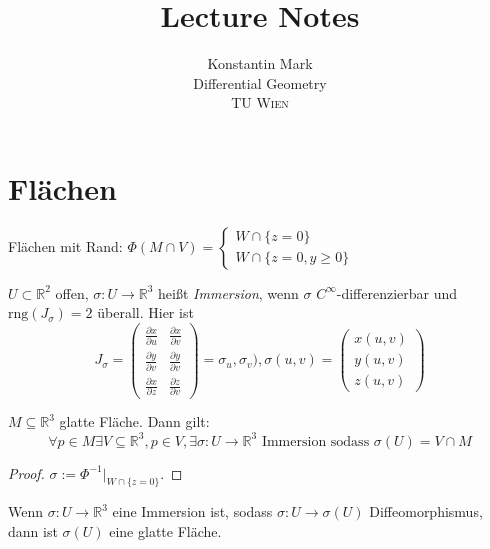 \documentclass[11pt]{article}
\title{Lecture Notes}
\author{Konstantin Mark\\
Differential Geometry\\ 
\textsc{TU Wien}
}
\begin{document}
\maketitle

\section{Flächen}
Flächen mit Rand: $\Phi(M\cap V) = \left\{\begin{array}{c}
     W\cap \{z= 0\}  \\
     W\cap \{z= 0,y\geq 0\} 
\end{array}\right.$
\begin{definition}
$U\subset \mathbb R^2$ offen, $\sigma: U\to \mathbb R^3$ heißt \textit{Immersion}, wenn $\sigma$ $C^\infty$-differenzierbar und $\mathrm{rng}(J_\sigma) = 2$ überall. Hier ist \begin{equation*}
    J_\sigma = \left(\begin{array}{ccc}
         \frac{\partial x}{\partial u}& \frac{\partial x}{\partial v} \\
         \frac{\partial y}{\partial v}& \frac{\partial y}{\partial v} \\
         \frac{\partial x}{\partial z}& \frac{\partial z}{\partial v} 
    \end{array}\right) = \sigma_u, \sigma_v), \sigma(u,v) = \left(\begin{array}{c}
         x(u,v)\\
         y(u,v) \\
         z(u,v)
    \end{array}\right)
\end{equation*}
\end{definition}
\begin{theorem}
$M\subseteq \mathbb R^3$ glatte Fläche. Dann gilt: \begin{equation*}
    \forall p\in M \exists V\subseteq \mathbb R^3, p\in V, \exists \sigma: U\to \mathbb R^3 \text{ Immersion sodass } \sigma (U) = V\cap M
\end{equation*}
\end{theorem}
\begin{proof}
$\sigma:= \Phi^{-1}|_{W\cap \{z= 0\}}$.
\end{proof}
\begin{theorem}\label{thm:immersion}
Wenn $\sigma: U\to \mathbb R^3$ eine Immersion ist, sodass $\sigma: U \to \sigma(U)$ Diffeomorphismus, dann ist $\sigma(U)$ eine glatte Fläche.
\end{theorem}
\end{document}
